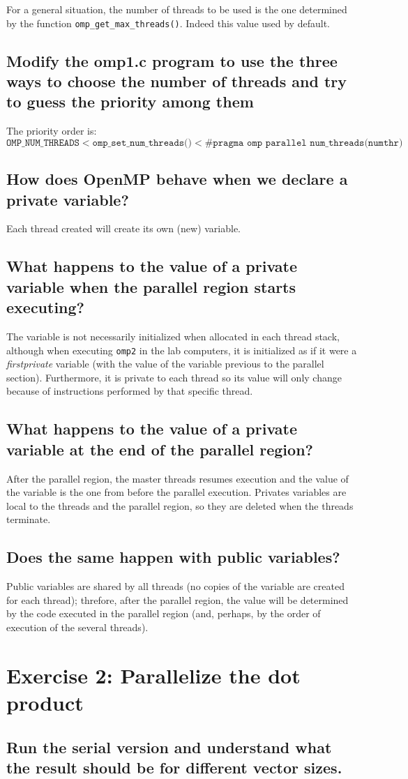 \documentclass{article}
\newcommand{\question}[1]{\subsection{#1}}
\begin{document}
For a general situation, the number of threads to be used is the one determined by the function \texttt{omp\_get\_max\_threads()}. Indeed this value used by default.

\question{Modify the omp1.c program to use the three ways to choose the number of threads and try to guess the priority among them}

The priority order is: $$\texttt{OMP\_NUM\_THREADS} < \texttt{omp\_set\_num\_threads()} < \texttt{\#pragma\ omp parallel num\_threads(numthr})$$

\question{How does OpenMP behave when we declare a private variable?}

Each thread created will create its own (new) variable.

\question{What happens to the value of a private variable when the parallel region starts executing?}

The variable is not necessarily initialized when allocated in each thread stack, although when executing \texttt{omp2} in the lab computers, it is initialized as if it were a \emph{firstprivate} variable (with the value of the variable previous to the parallel section). Furthermore, it is private to each thread so its value will only change because of instructions performed by that specific thread.

\question{What happens to the value of a private variable at the end of the parallel region?}

After the parallel region, the master threads resumes execution and the value of the variable is the one from before the parallel execution. Privates variables are local to the threads and the parallel region, so they are deleted when the threads terminate.

\question{Does the same happen with public variables?}

Public variables are shared by all threads (no copies of the variable are created for each thread); threfore, after the parallel region, the value will be determined by the code executed in the parallel region (and, perhaps, by the order of execution of the several threads).



\section{Exercise 2: Parallelize the dot product}

\question{Run the serial version and understand what the result should be for different vector sizes.} 
    
\end{document}
